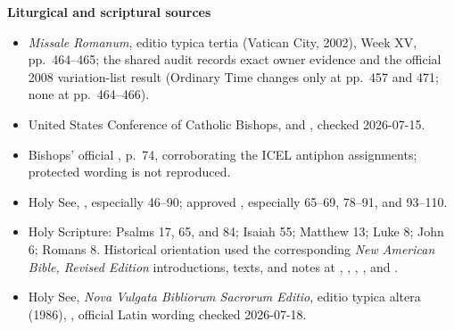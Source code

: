\textbf{Liturgical and scriptural sources}
{\footnotesize
\begin{itemize}[itemsep=0em,topsep=0.15em,parsep=0pt]
\item \emph{Missale Romanum}, editio typica tertia (Vatican City, 2002), Week XV, pp.~464--465; the shared audit records exact owner evidence and the official 2008 variation-list result (Ordinary Time changes only at pp.~457 and 471; none at pp.~464--466).
\item United States Conference of Catholic Bishops,  and , checked 2026-07-15.
\item Bishops' official , p.~74, corroborating the ICEL antiphon assignments; protected wording is not reproduced.
\item Holy See, , especially 46--90; approved , especially 65--69, 78--91, and 93--110.
\item Holy Scripture: Psalms 17, 65, and 84; Isaiah 55; Matthew 13; Luke 8; John 6; Romans 8. Historical orientation used the corresponding \emph{New American Bible, Revised Edition} introductions, texts, and notes at , , , , and .
\item Holy See, \emph{Nova Vulgata Bibliorum Sacrorum Editio}, editio typica altera (1986), , official Latin wording checked 2026-07-18.
\end{itemize}}

